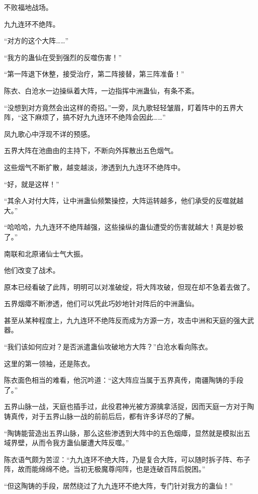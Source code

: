 
\begin{this_body}

不败福地战场。

九九连环不绝阵。

“对方的这个大阵……”

“我方的蛊仙在受到强烈的反噬伤害！”

“第一阵退下休整，接受治疗，第二阵接替，第三阵准备！”

陈衣、白沧水一边操纵着大阵，一边指挥中洲蛊仙，有条不紊。

“没想到对方竟然会出这样的奇招。”一旁，凤九歌轻轻皱眉，盯着阵中的五界大阵，“这下麻烦了，搞不好九九连环不绝阵会因此……”

凤九歌心中浮现不详的预感。

五界大阵在池曲由的主持下，不断向外挥散出五色烟气。

这些烟气不断扩散，越变越淡，渗透到九九连环不绝阵中。

“好，就是这样！”

“其余人对付大阵，让中洲蛊仙频繁操控，大阵运转越多，他们承受的反噬就越大。”

“哈哈哈，九九连环不绝阵越强，这些操纵的蛊仙遭受的伤害就越大！真是妙极了。”

南联和北原诸仙士气大振。

他们改变了战术。

原本已经看破了此阵，明明可以对准破绽，将大阵攻破，但现在却不急着去做了。

五界烟瘴不断渗透，他们可以凭此巧妙地针对阵后的中洲蛊仙。

甚至从某种程度上，九九连环不绝阵反而成为方源一方，攻击中洲和天庭的强大武器。

“我们该如何应对？是否派遣蛊仙攻破地方大阵？”白沧水看向陈衣。

这里的第一领袖，还是陈衣。

陈衣面色相当的难看，他沉吟道：“这大阵应当属于五界真传，南疆陶铸的手段了。”

五界山脉一战，天庭也插手过，此役君神光被方源擒拿活捉，因而天庭一方对于陶铸真传，对于五界山脉一战的前前后后，都有许多详尽的了解。

“陶铸能营造出五界山脉，那么这些渗透到大阵中的五色烟瘴，显然就是模拟出五域界壁，从而令我方蛊仙屡遭大阵反噬。”

陈衣语气颇为苦涩：“九九连环不绝大阵，乃是复合大阵，可以随时拆子阵、布子阵，故而能绵绵不绝。当初无极魔尊闯阵，也是连破百阵后脱困。”

“但这陶铸的手段，居然绕过了九九连环不绝大阵，专门针对我方的蛊仙！”


\end{this_body}

